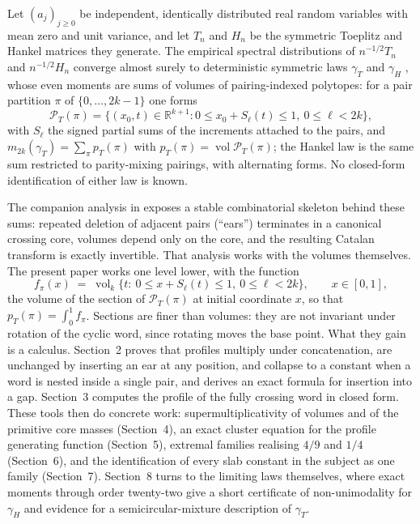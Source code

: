 \documentclass[11pt,reqno]{amsart}
\theoremstyle{plain}
\theoremstyle{remark}
\begin{document}
Let $(a_j)_{j\ge0}$ be independent, identically distributed real random
variables with mean zero and unit variance, and let $T_n$ and $H_n$ be
the symmetric Toeplitz and Hankel matrices they generate.  The empirical
spectral distributions of $n^{-1/2}T_n$ and $n^{-1/2}H_n$ converge
almost surely to deterministic symmetric laws $\gamma_T$ and $\gamma_H$
\cite{BDJ,HM}, whose even moments are sums of volumes of
pairing-indexed polytopes: for a pair partition $\pi$ of
$\{0,\dots,2k-1\}$ one forms
\[
\mathcal P_T(\pi)=\bigl\{(x_0,t)\in\mathbb R^{k+1}:
0\le x_0+S_\ell(t)\le1,\ 0\le\ell<2k\bigr\},
\]
with $S_\ell$ the signed partial sums of the increments attached to the
pairs, and $m_{2k}(\gamma_T)=\sum_\pi p_T(\pi)$ with
$p_T(\pi)=\operatorname{vol}\mathcal P_T(\pi)$; the Hankel law is the
same sum restricted to parity-mixing pairings, with alternating forms.
No closed-form identification of either law is known.

The companion analysis in \cite{Shmalo} exposes a stable combinatorial
skeleton behind these sums: repeated deletion of adjacent pairs
(``ears'') terminates in a canonical crossing core, volumes depend only
on the core, and the resulting Catalan transform is exactly invertible.
That analysis works with the volumes themselves.  The present paper
works one level lower, with the function
\[
f_\pi(x)\;=\;\operatorname{vol}_k\bigl\{t:\ 0\le x+S_\ell(t)\le1,\
0\le\ell<2k\bigr\},\qquad x\in[0,1],
\]
the volume of the section of $\mathcal P_T(\pi)$ at initial coordinate
$x$, so that $p_T(\pi)=\int_0^1f_\pi$.  Sections are finer than
volumes: they are not invariant under rotation of the cyclic word, since
rotating moves the base point.  What they gain is a calculus.
Section~2 proves that profiles multiply under concatenation, are
unchanged by inserting an ear at any position, and collapse to a
constant when a word is nested inside a single pair, and derives an
exact formula for insertion into a gap.  Section~3 computes the profile
of the fully crossing word in closed form.  These tools then do
concrete work: supermultiplicativity of volumes and of the primitive
core masses (Section~4), an exact cluster equation for the profile
generating function (Section~5), extremal families realising $4/9$ and
$1/4$ (Section~6), and the identification of every slab constant in the
subject as one family (Section~7).  Section~8 turns to the limiting laws
themselves, where exact moments through order twenty-two give a short
certificate of non-unimodality for $\gamma_H$ and evidence for a
semicircular-mixture description of $\gamma_T$.
\end{document}
